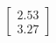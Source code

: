 \documentclass[preview]{standalone}
\begin{document}
\begin{align*}
\begin{bmatrix} 2.53 \\ 3.27 \end{bmatrix}
\end{align*}
\end{document}
